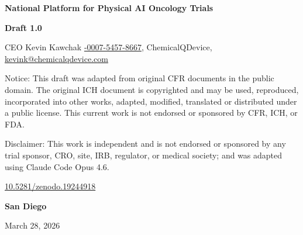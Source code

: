 \thispagestyle{coverpage}
\setlength{\headheight}{32pt}

\vspace*{4cm}

\begin{center}
    {\fontsize{22}{26}\selectfont\bfseries National Platform for Physical AI Oncology Trials}\\

    \vspace{2cm}

    {\bf Draft 1.0}\\

    \vspace{0.5cm}

    CEO Kevin Kawchak
    \href{https://orcid.org/0009-0007-5457-8667}{\fontsize{8}{10}-0007-5457-8667},
    ChemicalQDevice,
    \href{mailto:kevink@chemicalqdevice.com}{kevink@chemicalqdevice.com}\\

    \vspace{0.5cm}

    Notice: This draft was adapted from original CFR documents in the public
    domain. The original ICH document is copyrighted and may be used,
    reproduced, incorporated into other works, adapted, modified, translated
    or distributed under a public license. This current work is not endorsed
    or sponsored by CFR, ICH, or FDA.\\

    \vspace{0.5cm}

    Disclaimer: This work is independent and is not endorsed or sponsored by any trial sponsor,
    CRO, site, IRB, regulator, or medical society; and was adapted using Claude Code Opus 4.6.\\

    \vspace{0.5cm}

    \href{https://doi.org/10.5281/zenodo.19244918}{10.5281/zenodo.19244918}\\

    \vspace{3cm}

    {\bf San Diego}\\

    \vspace{3cm}

    March 28, 2026

\end{center}

\newpage
\setlength{\headheight}{32pt}
